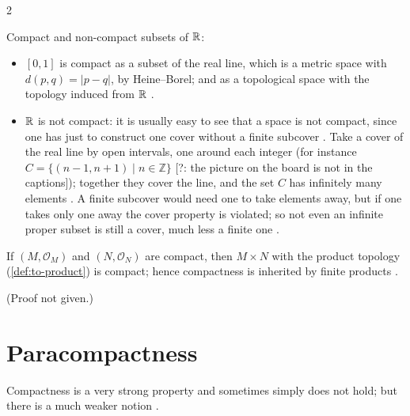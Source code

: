 \begin{paracol}{2}
\begin{example}\label{ex:iv-compact-ex}
Compact and non-compact subsets of $\mathbb{R}$:
\begin{itemize}
  \item $[0,1]$ is compact as a subset of the real line, which is a metric space with $d(p,q)=|p-q|$, by Heine--Borel; and as a topological space with the
        topology induced from $\mathbb{R}$ .
  \item $\mathbb{R}$ is not compact: it is usually easy to see that a space is not compact, since one has just to construct one cover without a finite
        subcover . Take a cover of the real line by open intervals, one around each integer (for instance
        $C=\{(n-1,n+1)\mid n\in\mathbb Z\}$ [?: the picture on the board is not in the captions]); together they cover the line, and the set $C$ has infinitely many elements
        . A finite subcover would need one to take elements away, but if one takes only one away the cover
        property is violated; so not even an infinite proper subset is still a cover, much less a finite one .
\end{itemize}
\end{example}
\begin{theorem}\label{thm:iv-compact-prod}
If $(M,\mathcal O_M)$ and $(N,\mathcal O_N)$ are compact, then $M\times N$ with the product topology (\cref{def:to-product}) is compact; hence compactness
is inherited by finite products .
\end{theorem}
(Proof not given.)

\section{Paracompactness}\label{sec:iv-paracompact}

Compactness is a very strong property and sometimes simply does not hold; but there is a much weaker notion .


\end{paracol}

